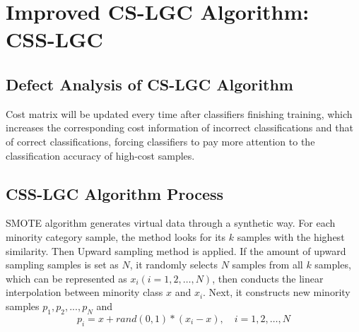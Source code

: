 \documentclass{svjour3}                     %
\begin{document}
\section{Improved CS-LGC Algorithm: CSS-LGC}
\subsection{Defect Analysis of CS-LGC Algorithm}

Cost matrix will be updated every time after classifiers finishing training, which increases the corresponding cost information of incorrect classifications and that of correct classifications, forcing classifiers to pay more attention to the classification accuracy of high-cost samples.

\subsection{CSS-LGC Algorithm Process}
 SMOTE algorithm generates virtual data through a synthetic way. For each minority category sample, the method looks for its $k$ samples with the highest similarity. Then Upward sampling method is applied. If the amount of upward sampling samples is set as $N$, it randomly selects $N$ samples from all $k$ samples, which can be represented as ${x_i}\left( {i = 1,2, \ldots ,N} \right)$, then conducts the linear interpolation between minority class $x$ and $x_i$. Next, it constructs new minority samples ${p_1},{p_2},...,{p_N}$ and 
 \begin{equation}\label{formula:init}
  {p_i} = x + rand(0,1)*({x_i} - x), \quad i = 1,2,\ldots,N
 \end{equation}
\end{document}
